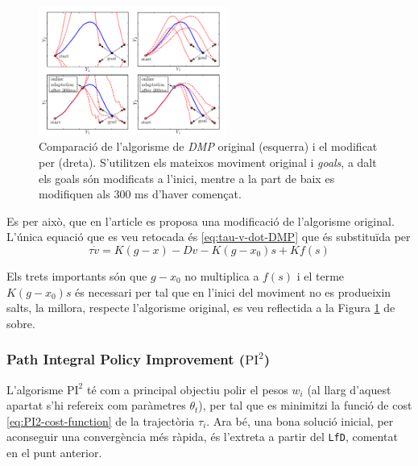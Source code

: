 \documentclass[12pt,a4paper,final,twoside]{article}
\begin{document}
\begin{figure}
\centering
\includegraphics[width=0.55\textwidth]{Imatges/DMP-modified-algorism}
\caption[Comparació de l'algorisme de \textit{DMP} original (esquerra) i el modificat  per \cite{Pastor2009} (dreta)]{Comparació de l'algorisme de \textit{DMP} original (esquerra) i el modificat  per \cite{Pastor2009} (dreta). S'utilitzen els mateixos moviment original i \textit{goals}, a dalt els goals són modificats a l'inici, mentre a la part de baix es modifiquen als 300 ms d'haver començat.}
\label{fig:DMP-modified-algorism}
\end{figure}

Es per això, que en l'article \cite{Pastor2009} es proposa una modificació de l'algorisme original. L'única equació que es veu retocada és \eqref{eq:tau-v-dot-DMP} que és substituïda per
\begin{equation}\label{eq:tau-v-dot-DMP-modified}
\tau \dot{v} = K(g - x) - Dv - K(g - x_0)s + K f(s)
\end{equation}

Els trets importants són que $g - x_0$ no multiplica a $f(s)$ i el terme $K(g - x_0)s$ és necessari per tal que en l'inici del moviment no es produeixin salts, la millora, respecte l'algorisme original, es veu reflectida a la Figura \ref{fig:DMP-modified-algorism} de sobre.


\subsubsection{\textbf{P}ath \textbf{I}ntegral \textbf{P}olicy \textbf{I}mprovement ($\mathrm{PI^2}$)}
\label{PI2-estat-de-l'art}

L'algorisme $\mathrm{PI^2}$ \cite{Stulp2011} té com a principal objectiu polir el pesos $w_i$ (al llarg d'aquest apartat s'hi refereix com paràmetres $\theta_t$), per tal que es minimitzi la funció de cost \eqref{eq:PI2-cost-function} de la trajectòria $\tau_i$. Ara bé, una bona solució inicial, per aconseguir una convergència més ràpida, és l'extreta a partir del \texttt{LfD}, comentat en el punt anterior.
\end{document}
